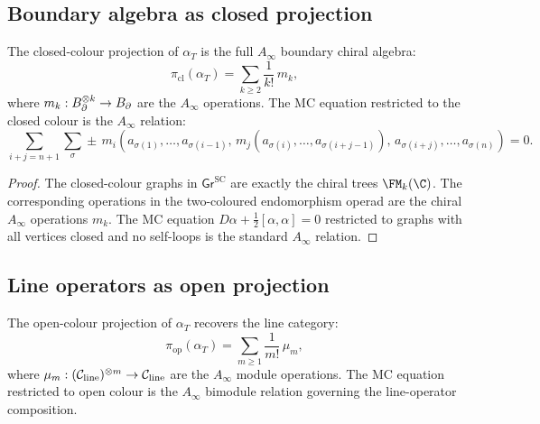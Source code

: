 \subsection{Boundary algebra as closed projection}

\begin{theorem}
The closed-colour projection of $\alpha_T$ is the full $A_\infty$
boundary chiral algebra:
\begin{equation}%
\pi_{\mathrm{cl}}(\alpha_T)
= \sum_{k\ge 2}\frac{1}{k!}\,m_k,
\end{equation}
where $m_k:B_{\partial}^{\otimes k}\to B_{\partial}$ are the $A_\infty$
operations. The MC equation restricted to the closed colour is
the $A_\infty$ relation:
\begin{equation}%
\sum_{i+j=n+1}\sum_{\sigma}
\pm\, m_i(a_{\sigma(1)},\ldots,a_{\sigma(i-1)},\,
m_j(a_{\sigma(i)},\ldots,a_{\sigma(i+j-1)}),\,
a_{\sigma(i+j)},\ldots,a_{\sigma(n)})
= 0.
\end{equation}
\end{theorem}

\begin{proof}
The closed-colour graphs in $\mathsf{Gr}^{\mathrm{SC}}$ are
exactly the chiral trees $\FM_k(\C)$. The corresponding
operations in the two-coloured endomorphism operad are the chiral
$A_\infty$ operations $m_k$. The MC equation
$D\alpha+\tfrac{1}{2}[\alpha,\alpha]=0$ restricted to graphs
with all vertices closed and no self-loops is the standard
$A_\infty$ relation.
\end{proof}


\subsection{Line operators as open projection}

\begin{theorem}
The open-colour projection of $\alpha_T$ recovers the line
category:
\begin{equation}%
\pi_{\mathrm{op}}(\alpha_T)
= \sum_{m\ge 1}\frac{1}{m!}\,\mu_m,
\end{equation}
where $\mu_m:(\mathcal C_{\mathrm{line}})^{\otimes m}\to\mathcal C_{\mathrm{line}}$
are the $A_\infty$ module operations. The MC equation restricted
to open colour is the $A_\infty$ bimodule relation governing the
line-operator composition.
\end{theorem}

